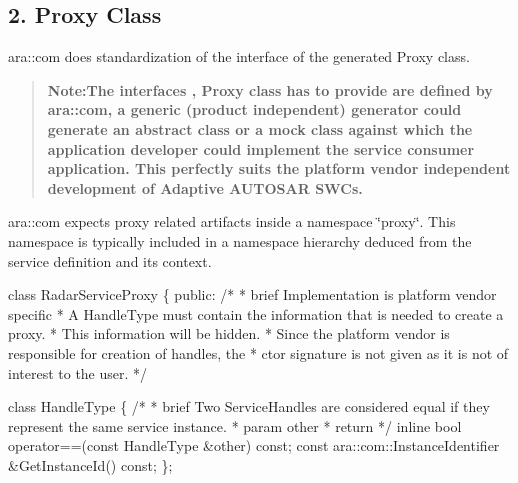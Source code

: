 \subsection*{2. Proxy Class}


\begin{DoxyItemize}
\item ara\+::com does standardization of the interface of the generated Proxy class. \begin{quote}
{\bfseries Note\+:The interfaces , Proxy class has to provide are defined by ara\+::com, a generic (product independent) generator could generate an abstract class or a mock class against which the application developer could implement the service consumer application. This perfectly suits the platform vendor independent development of Adaptive A\+U\+T\+O\+S\+AR S\+W\+Cs.} \end{quote}

\item ara\+::com expects proxy related artifacts inside a namespace \char`\"{}proxy\char`\"{}. This namespace is typically included in a namespace hierarchy deduced from the service definition and its context. 
\begin{DoxyCode}
\textcolor{keyword}{class }RadarServiceProxy \{
  \textcolor{keyword}{public}:
  \textcolor{comment}{/* }
\textcolor{comment}{   * brief Implementation is platform vendor specific}
\textcolor{comment}{   * A HandleType must contain the information that is needed to create a}
\textcolor{comment}{     proxy.}
\textcolor{comment}{   * This information will be hidden.}
\textcolor{comment}{   * Since the platform vendor is responsible for creation of handles, the}
\textcolor{comment}{   * ctor signature is not given as it is not of interest to the user.}
\textcolor{comment}{   */}

  \textcolor{keyword}{class }HandleType \{
  \textcolor{comment}{/*}
\textcolor{comment}{   * brief Two ServiceHandles are considered equal if they represent the}
\textcolor{comment}{     same service instance.}
\textcolor{comment}{   * param other}
\textcolor{comment}{   * return}
\textcolor{comment}{   */}
  \textcolor{keyword}{inline} \textcolor{keywordtype}{bool} operator==(\textcolor{keyword}{const} HandleType &other) \textcolor{keyword}{const};
  \textcolor{keyword}{const} ara::com::InstanceIdentifier &GetInstanceId() \textcolor{keyword}{const};
  \};


\end{DoxyCode}
\end{DoxyItemize}
